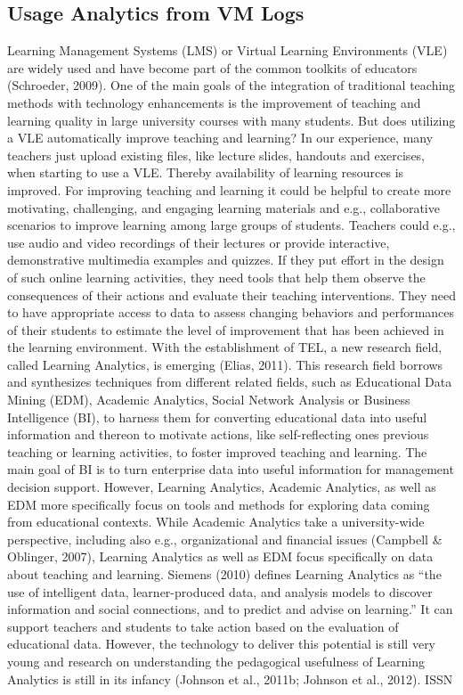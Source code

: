 \documentclass{llncs}
\begin{document}
\subsection{Usage Analytics from VM Logs}
Learning Management Systems (LMS) or Virtual Learning Environments (VLE) are widely used and have become part of the common toolkits of educators (Schroeder, 2009). One of the main goals of the integration of traditional teaching methods with technology enhancements is the improvement of teaching and learning quality in large university courses with many students. But does utilizing a VLE automatically improve teaching and learning? In our experience, many teachers just upload existing files, like lecture slides, handouts and exercises, when starting to use a VLE. Thereby availability of learning resources is improved. For improving teaching and learning it could be helpful to create more motivating, challenging, and engaging learning materials and e.g., collaborative scenarios to improve learning among large groups of students. Teachers could e.g., use audio and video recordings of their lectures or provide interactive, demonstrative multimedia examples and quizzes. If they put effort in the design of such online learning activities, they need tools that help them observe the consequences of their actions and evaluate their teaching interventions. They need to have appropriate access to data to assess changing behaviors and performances of their students to estimate the level of improvement that has been achieved in the learning environment.
With the establishment of TEL, a new research field, called Learning Analytics, is emerging (Elias, 2011). This research field borrows and synthesizes techniques from different related fields, such as Educational Data Mining (EDM), Academic Analytics, Social Network Analysis or Business Intelligence (BI), to harness them for converting educational data into useful information and thereon to motivate actions, like self-reflecting ones previous teaching or learning activities, to foster improved teaching and learning. The main goal of BI is to turn enterprise data into useful information for management decision support. However, Learning Analytics, Academic Analytics, as well as EDM more specifically focus on tools and methods for exploring data coming from educational contexts. While Academic Analytics take a university-wide perspective, including also e.g., organizational and financial
issues
(Campbell \& Oblinger, 2007), Learning Analytics as well as EDM focus specifically on data about teaching and learning.
Siemens (2010) defines Learning Analytics as “the use of intelligent data, learner-produced data, and analysis models to discover information and social connections, and to predict and advise on learning.” It can support teachers and students to take action based on the evaluation of educational data. However, the technology to deliver this potential is still very young and research on understanding the pedagogical usefulness of Learning Analytics is still in its infancy (Johnson et al., 2011b; Johnson et al., 2012).
ISSN
\end{document}
